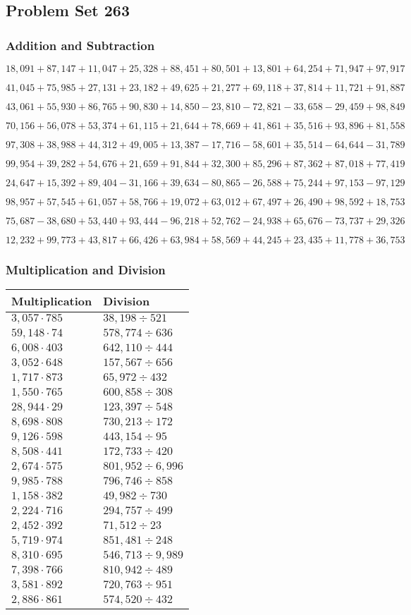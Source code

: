 \hypertarget{problem-set-263}{%
\subsection{Problem Set 263}\label{problem-set-263}}

\hypertarget{addition-and-subtraction}{%
\subsubsection{Addition and
Subtraction}\label{addition-and-subtraction}}

\(18,091+87,147+11,047+25,328+88,451+80,501+13,801+64,254+71,947+97,917\)

\(41,045+75,985+27,131+23,182+49,625+21,277+69,118+37,814+11,721+91,887\)

\(43,061+55,930+86,765+90,830+14,850-23,810-72,821-33,658-29,459+98,849\)

\(70,156+56,078+53,374+61,115+21,644+78,669+41,861+35,516+93,896+81,558\)

\(97,308+38,988+44,312+49,005+13,387-17,716-58,601+35,514-64,644-31,789\)

\(99,954+39,282+54,676+21,659+91,844+32,300+85,296+87,362+87,018+77,419\)

\(24,647+15,392+89,404-31,166+39,634-80,865-26,588+75,244+97,153-97,129\)

\(98,957+57,545+61,057+58,766+19,072+63,012+67,497+26,490+98,592+18,753\)

\(75,687-38,680+53,440+93,444-96,218+52,762-24,938+65,676-73,737+29,326\)

\(12,232+99,773+43,817+66,426+63,984+58,569+44,245+23,435+11,778+36,753\)

\hypertarget{multiplication-and-division}{%
\subsubsection{Multiplication and
Division}\label{multiplication-and-division}}

\begin{longtable}[]{@{}ll@{}}
\toprule
Multiplication & Division\tabularnewline
\midrule
\endhead
\(3,057\cdot785\) & \(38,198÷521\)\tabularnewline
\(59,148\cdot74\) & \(578,774÷636\)\tabularnewline
\(6,008\cdot403\) & \(642,110÷444\)\tabularnewline
\(3,052\cdot648\) & \(157,567÷656\)\tabularnewline
\(1,717\cdot873\) & \(65,972÷432\)\tabularnewline
\(1,550\cdot765\) & \(600,858÷308\)\tabularnewline
\(28,944\cdot29\) & \(123,397÷548\)\tabularnewline
\(8,698\cdot808\) & \(730,213÷172\)\tabularnewline
\(9,126\cdot598\) & \(443,154÷95\)\tabularnewline
\(8,508\cdot441\) & \(172,733÷420\)\tabularnewline
\(2,674\cdot575\) & \(801,952÷6,996\)\tabularnewline
\(9,985\cdot788\) & \(796,746÷858\)\tabularnewline
\(1,158\cdot382\) & \(49,982÷730\)\tabularnewline
\(2,224\cdot716\) & \(294,757÷499\)\tabularnewline
\(2,452\cdot392\) & \(71,512÷23\)\tabularnewline
\(5,719\cdot974\) & \(851,481÷248\)\tabularnewline
\(8,310\cdot695\) & \(546,713÷9,989\)\tabularnewline
\(7,398\cdot766\) & \(810,942÷489\)\tabularnewline
\(3,581\cdot892\) & \(720,763÷951\)\tabularnewline
\(2,886\cdot861\) & \(574,520÷432\)\tabularnewline
\bottomrule
\end{longtable}
